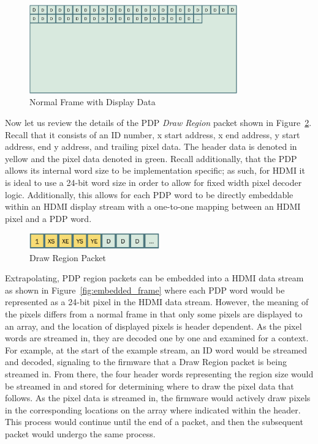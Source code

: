     \begin{figure}
        \centering
        \includegraphics[width=0.8\textwidth]{fig/classic_video.pdf}
        \caption{Normal Frame with Display Data}
        \label{fig:classic_video}
    \end{figure}

    Now let us review the details of the PDP {\it Draw Region} packet shown in Figure~\ref{fig:packet_refresher}. Recall that it consists of an ID number, x start address, x end address, y start address, end y address, and trailing pixel data. The header data is denoted in yellow and the pixel data denoted in green. Recall additionally, that the PDP allows its internal word size to be implementation specific; as such, for HDMI it is ideal to use a 24-bit word size in order to allow for fixed width pixel decoder logic. Additionally, this allows for each PDP word to be directly embeddable within an HDMI display stream with a one-to-one mapping between an HDMI pixel and a PDP word.

    \begin{figure}
        \centering
        \includegraphics[width=0.5\textwidth]{fig/packet_refresher.pdf}
        \caption{Draw Region Packet}
        \label{fig:packet_refresher}
    \end{figure}

    Extrapolating, PDP region packets can be embedded into a HDMI data stream as shown in Figure~\ref{fig:embedded_frame} where each PDP word would be represented as a 24-bit pixel in the HDMI data stream. However, the meaning of the pixels differs from a normal frame in that only some pixels are displayed to an array, and the location of displayed pixels is header dependent. As the pixel words are streamed in, they are decoded one by one and examined for a context. For example, at the start of the example stream, an ID word would be streamed and decoded, signaling to the firmware that a Draw Region packet is being streamed in. From there, the four header words representing the region size would be streamed in and stored for determining where to draw the pixel data that follows. As the pixel data is streamed in, the firmware would actively draw pixels in the corresponding locations on the array where indicated within the header. This process would continue until the end of a packet, and then the subsequent packet would undergo the same process.

